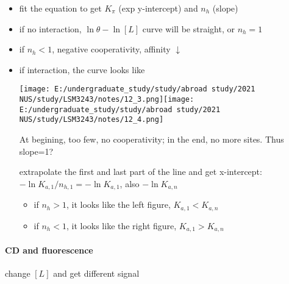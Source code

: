 \documentclass[]{article}
\let\oldparagraph\paragraph
\renewcommand{\paragraph}[1]{\oldparagraph{#1}\mbox{}}
\begin{document}
\begin{itemize}
\item
  fit the equation to get \(K_\pi\) (exp y-intercept) and \(n_h\)
  (slope)
\item
  if no interaction, \(\ln\theta-\ln[L]\) curve will be straight, or
  \(n_h=1\)
\item
  if \(n_h<1\), negative cooperativity, affinity \(\downarrow\)
\item
  if interaction, the curve looks like

  \texttt{[image: E:/undergraduate\_study/study/abroad study/2021 NUS/study/LSM3243/notes/12\_3.png]}\texttt{[image: E:/undergraduate\_study/study/abroad study/2021 NUS/study/LSM3243/notes/12\_4.png]}

  At begining, too few, no cooperativity; in the end, no more sites.
  Thus slope=1?

  extrapolate the first and last part of the line and get x-intercept:
  \(-\ln K_{a,1}/n_{h,1}=-\ln K_{a,1}\), also \(-\ln K_{a,n}\)

  \begin{itemize}
  \item
    if \(n_h>1\), it looks like the left figure, \(K_{a,1}<K_{a,n}\)
  \item
    if \(n_h<1\), it looks like the right figure, \(K_{a,1}>K_{a,n}\)
  \end{itemize}
\end{itemize}

\hypertarget{cd-and-fluorescence}{%
\paragraph{CD and fluorescence}\label{cd-and-fluorescence}}

change \([L]\) and get different signal
\end{document}

